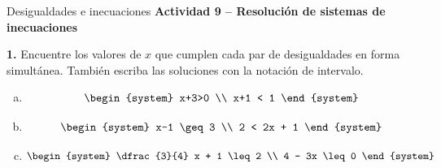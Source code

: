 \documentclass[9pt, aspectratio=169]{beamer}
\begin{document}
\begin{frame}{Desigualdades e inecuaciones}
\textbf{Actividad 9 -- Resolución de sistemas de inecuaciones}

\textbf{1.} Encuentre los valores de $x$ que cumplen cada par de desigualdades en forma simultánea. También escriba las soluciones con la notación de intervalo.

\begin{multicols}{3}
    \begin{enumerate}[a)]
        \item \[ \begin{system} x+3>0 \\ x+1 < 1 \end{system} \]
        \item \[ \begin{system} x-1 \geq 3 \\ 2 < 2x + 1 \end{system} \]
        \item \[ \begin{system} \dfrac{3}{4} x + 1 \leq 2 \\ 4 - 3x \leq 0 \end{system} \]
    \end{enumerate}
\end{multicols}

\end{frame}
\end{document}
